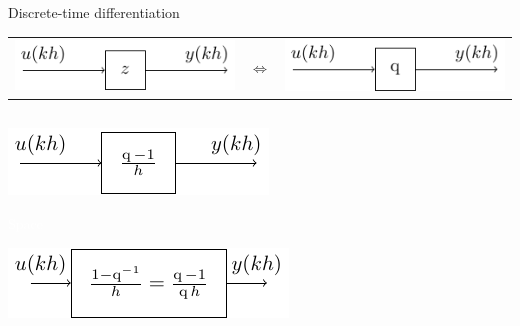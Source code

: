 \documentclass[presentation,aspectratio=1610]{beamer}
\begin{document}
\begin{frame}[label={sec:org2b5bba8}]{Discrete-time differentiation}
\begin{center}
\begin{tabular}{lll}
\includegraphics[width=0.3\linewidth]{../../figures/block-simple-shift-z} & \(\Leftrightarrow\) & \includegraphics[width=0.3\linewidth]{../../figures/block-simple-shift}\\
\end{tabular}
\end{center}



\begin{columns}
\begin{column}{0.4\columnwidth}
\vspace*{5mm}

\includegraphics[width=\linewidth]{../../figures/block-simple-discrete-derivative-fwd}

\textcolor{white}{Space}

\begin{center}
\includegraphics[width=\linewidth]{../../figures/block-simple-discrete-derivative}
\end{center}
\end{column}

\begin{column}{0.6\columnwidth}
\end{column}
\end{columns}
\end{frame}
\end{document}

